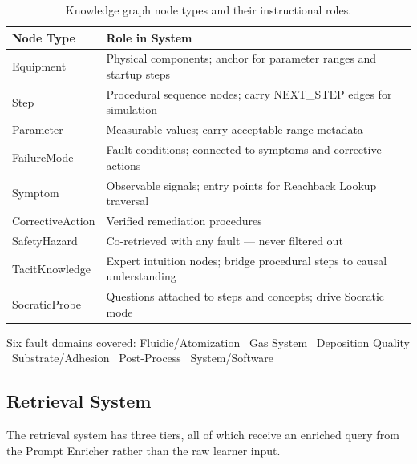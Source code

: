 \documentclass[10pt,letterpaper,twocolumn]{article}
\begin{document}
\begin{table}[t]
\centering
\begin{tabularx}{0.8\textwidth}{@{}l X@{}}
\toprule
\textbf{Node Type} & \textbf{Role in System} \\
\midrule
Equipment & Physical components; anchor for parameter ranges and startup steps \\
Step & Procedural sequence nodes; carry NEXT\_STEP edges for simulation \\
Parameter & Measurable values; carry acceptable range metadata \\
FailureMode & Fault conditions; connected to symptoms and corrective actions \\
Symptom & Observable signals; entry points for Reachback Lookup traversal \\
CorrectiveAction & Verified remediation procedures \\
SafetyHazard & Co-retrieved with any fault --- never filtered out \\
TacitKnowledge & Expert intuition nodes; bridge procedural steps to causal understanding \\
SocraticProbe & Questions attached to steps and concepts; drive Socratic mode \\
\bottomrule
\end{tabularx}
\caption{Knowledge graph node types and their instructional roles.}
\label{tab:node-types}
\end{table}

Six fault domains covered: Fluidic/Atomization \textbullet\ Gas System \textbullet\ Deposition Quality \textbullet\ Substrate/Adhesion \textbullet\ Post-Process \textbullet\ System/Software

\subsection{Retrieval System}
\label{sec:retrieval-system}

The retrieval system has three tiers, all of which receive an enriched query from the Prompt Enricher rather than the raw learner input.
\end{document}
